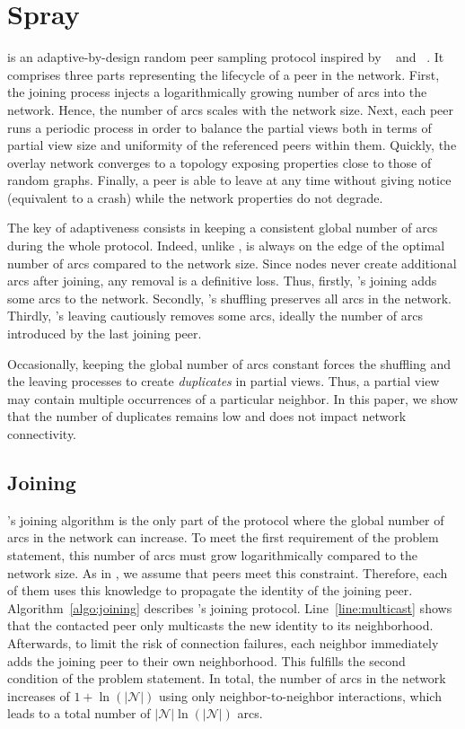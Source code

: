 
\section{Spray}
\label{sec:proposal}

\SPRAY is an adaptive-by-design random peer sampling protocol inspired by
\SCAMP~\cite{ganesh2003peer} and \CYCLON~\cite{voulgaris2005cyclon}. It
comprises three parts representing the lifecycle of a peer in the network.
First, the joining process injects a logarithmically growing number of arcs
into the network. Hence, the number of arcs scales with the network size.  Next,
each peer runs a periodic process in order to balance the partial views both in
terms of partial view size and uniformity of the referenced peers within
them. Quickly, the overlay network converges to a topology exposing properties
close to those of random graphs. Finally, a peer is able to leave at any time 
without giving notice (equivalent to a crash) while the network properties do
not degrade.

The key of adaptiveness consists in keeping a consistent global number
of arcs during the whole protocol. Indeed, unlike \CYCLON, \SPRAY is
always on the edge of the optimal number of arcs compared to the
network size. Since \SPRAY nodes never create additional arcs after
joining, any removal is a definitive loss. Thus, firstly, \SPRAY's
joining adds some arcs to the network. Secondly, \SPRAY's shuffling
preserves all arcs in the network. Thirdly, \SPRAY's leaving
cautiously removes some arcs, ideally the number of arcs introduced by
the last joining peer.

Occasionally, keeping the global number of arcs constant forces the shuffling
and the leaving processes to create \emph{duplicates} in partial views. Thus,
a partial view may contain multiple occurrences of a particular neighbor. In this
paper, we show that the number of duplicates remains low and does not
impact network connectivity.

\subsection{Joining}

\SPRAY's joining algorithm is the only part of the protocol where the
global number of arcs in the network can increase. To meet the first
requirement of the problem statement, this number of arcs must grow
logarithmically compared to the network size. As in \SCAMP, we assume
that peers meet this constraint. Therefore, each of them uses this
knowledge to propagate the identity of the joining
peer. Algorithm~\ref{algo:joining} describes \SPRAY's joining
protocol. Line~\ref{line:multicast} shows that the contacted peer only
multicasts the new identity to its neighborhood. Afterwards, to limit
the risk of connection failures, each neighbor immediately adds the
joining peer to their own neighborhood. This fulfills the second
condition of the problem statement.  In total, the number of arcs in
the network increases of $1+\ln(|\mathcal{N}|)$ using only
neighbor-to-neighbor interactions, which leads to a total number of
$|\mathcal{N}|\ln(|\mathcal{N}|)$ arcs.


